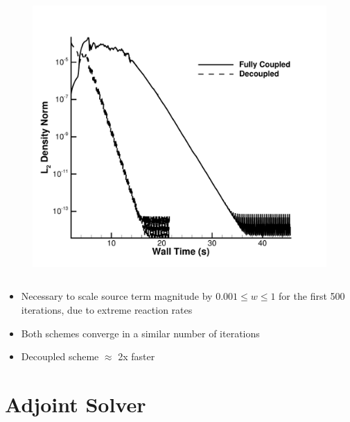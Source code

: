 \documentclass{beamer}
\begin{document}
\begin{frame}
\begin{columns}[t]
\begin{column}{0.5\textwidth}
\begin{figure}[h!]
	  \includegraphics[width=\textwidth]{figures/cone_walltime}
        \end{figure}
      \end{column}
    \end{columns}
  \begin{itemize}
    \item Necessary to scale source term magnitude by $0.001 \leq w \leq 1$ 
      for the first 500 iterations, due to extreme reaction rates
    \item Both schemes converge in a similar number of iterations
    \item Decoupled scheme $\approx$ 2x faster
  \end{itemize}
\end{frame}

\section{Adjoint Solver}
\end{document}
